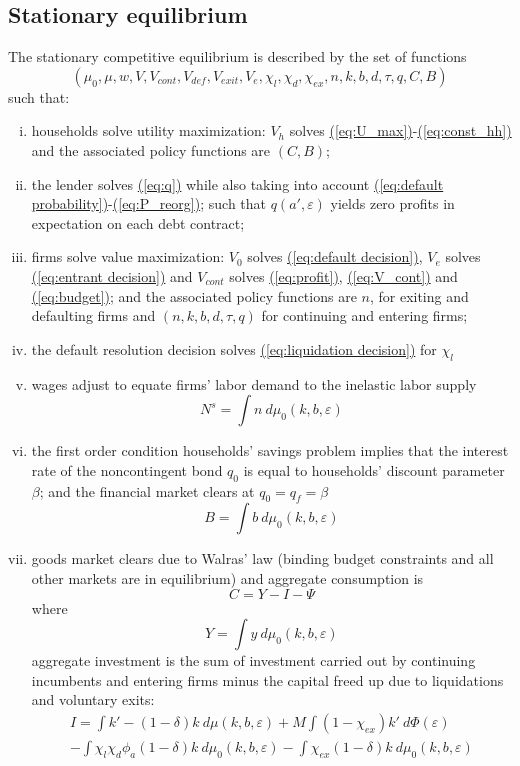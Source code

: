 \documentclass[12pt]{article}
\newcommand{\eref}[1]{\hyperref[#1]{(\ref*{#1})}}
\begin{document}
\subsection{Stationary equilibrium}\label{sec:eq}
The stationary competitive equilibrium is described by the set of functions
$$(\mu_0, \mu, w, V, V_{cont}, V_{def}, V_{exit}, V_e, \chi_l, \chi_d, \chi_{ex}, n,k,b,d,\tau,q, C, B)$$
such that: 
\begin{enumerate}[(i)]
\item households solve utility maximization: $V_h$ solves \eref{eq:U_max}-\eref{eq:const_hh} and the associated policy functions are $(C, B)$;
\item the lender solves \eref{eq:q} while also taking into account \eref{eq:default probability}-\eref{eq:P_reorg}; such that $q(a',\varepsilon)$ yields zero profits in expectation on each debt contract;
\item firms solve value maximization: $V_0$ solves \eref{eq:default decision}, $V_e$ solves \eref{eq:entrant decision} and $V_{cont}$ solves \eref{eq:profit}, \eref{eq:V_cont} and \eref{eq:budget}; and the associated policy functions are $n$, for exiting and defaulting firms and $(n,k,b,d,\tau,q)$ for continuing and entering firms;
\item the default resolution decision solves \eref{eq:liquidation decision}  for $\chi_l$
\item wages adjust to equate firms' labor demand to the inelastic labor supply
$$ N^s = \int n  \ d \mu_0 (k,b,\varepsilon)  $$
\item the first order condition households' savings problem implies that the interest rate of the noncontingent bond $q_0$ is equal to households' discount parameter $\beta$; and the financial market clears at $q_0 = q_f = \beta$
 $$ B = \int b \ d \mu_0 (k,b,\varepsilon) $$
\item goods market clears due to Walras' law (binding budget constraints and all other markets are in equilibrium) and aggregate consumption is
 $$ C = Y - I - \Psi$$
where
 $$ Y =  \int y \ d \mu_0 (k,b,\varepsilon) $$
aggregate investment is the sum of investment carried out by continuing incumbents and entering firms minus the capital freed up due to liquidations and voluntary exits:
\begin{multline*} 
    I = \int   k' -(1-\delta)k \ d \mu (k,b,\varepsilon) + M \int (1-\chi_{ex}) k' \ d \Phi(\varepsilon)    \\
   -  \int   \chi_l \chi_d \phi_a (1-\delta)k \ d \mu_0 (k,b,\varepsilon) - \int \chi_{ex} (1-\delta) k \ d \mu_0 (k,b,\varepsilon)   

\end{multline*}
\end{enumerate}
\end{document}
